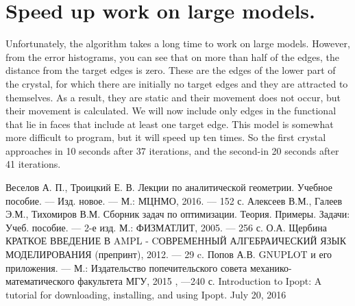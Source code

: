 \documentclass[11pt,fleqn,a4paper]{scrartcl}
\begin{document}
\section{Speed up work on large models.}
Unfortunately, the algorithm takes a long time to work on large models. However, from the error histograms, you can see that on more than half of the edges, the distance from the target edges is zero. These are the edges of the lower part of the crystal, for which there are initially no target edges and they are attracted to themselves. As a result, they are static and their movement does not occur, but their movement is calculated. We will now include only edges in the functional that lie in faces that include at least one target edge. This model is somewhat more difficult to program, but it will speed up ten times. So the first crystal approaches in 10 seconds after 37 iterations, and the second-in 20 seconds after 41 iterations.
\newpage
\begin{thebibliography}{5}
Веселов А. П., Троицкий Е. В. Лекции по аналитической геометрии. Учебное пособие. –– Изд. новое. –– М.: МЦНМО, 2016. –– 152 с. 
Алексеев В.М., Галеев Э.М., Тихомиров В.М. Сборник задач по оптимизации. Теория. Примеры. Задачи: Учеб. пособие. --- 2-е изд. М.: ФИЗМАТЛИТ, 2005. --- 256 с.
О.А. Щербина КРАТКОЕ ВВЕДЕНИЕ В AMPL - CОВРЕМЕННЫЙ АЛГЕБРАИЧЕСКИЙ ЯЗЫК МОДЕЛИРОВАНИЯ (препринт), 2012. --- 29 c. 
Попов А.В. GNUPLOT и его приложения. --- М.: Издательство попечительского совета механико-математического факультета МГУ, 2015 , ---240 с. 
 Introduction to Ipopt: A tutorial for downloading, installing, and using Ipopt. July 20, 2016
\end{thebibliography}
\end{document}
